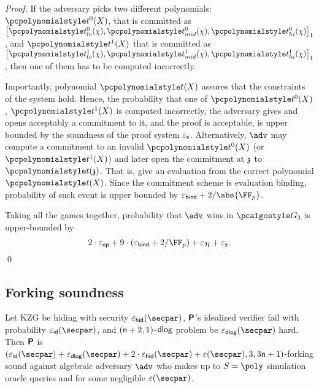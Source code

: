 \documentclass[runningheads,11pt]{llncs}
\begin{document}
\begin{proof}
  If the adversary picks two different polynomials: $\p{t^0}(X)$, that is committed
  as $\gone{\p{t^0_{lo}}(\chi), \p{t^0_{mid}}(\chi), \p{t^0_{hi}}(\chi)}$, and
  $\p{t^1}(X)$ that is committed as
  $\gone{\p{t^1_{lo}}(\chi), \p{t^1_{mid}}(\chi), \p{t^1_{hi}}(\chi)}$, then one of
  them has to be computed incorrectly. 

  Importantly, polynomial $\p{t}(X)$ assures that the constraints of the system
  hold. Hence, the probability that one of $\p{t^0}(X)$, $\p{t^1}(X)$ is computed
  incorrectly, the adversary gives and opens acceptably a commitment to it, and
  the proof is acceptable, is upper bounded by the soundness of the proof system
  $\varepsilon_{\mathsf{s}}$. Alternatively, $\adv$ may compute a commitment to an invalid
  $\p{t^0}(X)$ (or $\p{t^1}(X)$) and later open the commitment at $\mathfrak{z}$ to
  $\p{t}(\chz)$. That is, give an evaluation from the correct polynomial
  $\p{t}(X)$. Since the commitment scheme is evaluation binding, probability of
  such event is upper bounded by $\epsbinding + \infrac{2}{\abs{\FF_p}}$.

   Taking all the games together, probability that $\adv$ wins
  in $\game{3}$ is upper-bounded by
  \[
    2 \cdot \epsop + 9 \cdot (\epsbind + \infrac{2}{\FF_p}) + \epsro + \epss.
  \]
  \qed
\end{proof}

\subsection{Forking soundness}
\begin{lemma}
\label{lem:plonkprot_ss}
Let KZG be hiding with security $\epsh (\secpar)$, $\bm{\mathsf{P}}$'s idealized
verifier fail with probability $\epsid (\secpar)$, and $(\mathsf{n} + 2, 1)$-$\mathsf{dlog}$
problem be $\epsdlog (\secpar)$ hard. Then $\bm{\mathsf{P}}$ is
$(\epsid (\secpar) + \epsdlog (\secpar) + 2 \cdot \epsh(\secpar) +
\eps(\secpar), 3, 3 \noofc + 1)$-forking sound against algebraic adversary
$\adv$ who makes up to $S = \poly$ simulation oracle queries and for some
negligible $\eps(\secpar)$.
\end{lemma}
\end{document}

